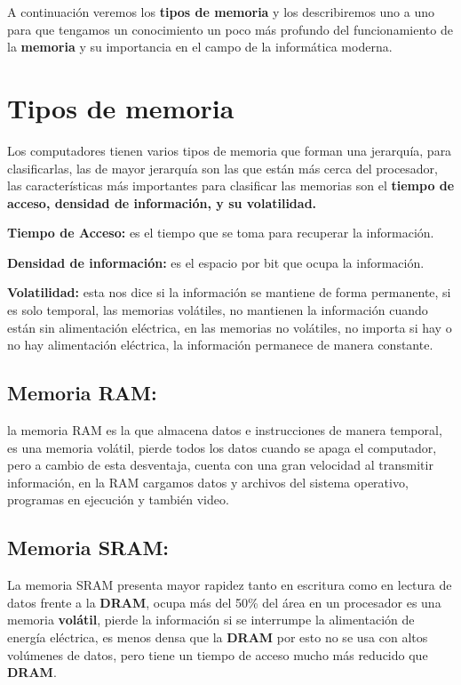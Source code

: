 \documentclass{article}
\begin{document}
\vspace{0.5cm}

A continuación veremos los \textbf{tipos de memoria} y los describiremos uno a uno para que tengamos un conocimiento un poco más profundo del funcionamiento de la \textbf{memoria} y su importancia en el campo de la informática moderna. 

\section{Tipos de memoria}

Los computadores tienen varios tipos de memoria que forman una jerarquía, para clasificarlas, las de mayor jerarquía son las que están más cerca del procesador, las características más importantes para clasificar las memorias son el \textbf{tiempo de acceso, densidad de información, y su volatilidad.}\cite{Pablo}

\vspace{0.5cm}

\textbf{Tiempo de Acceso:} es el tiempo que se toma para recuperar la información.

\vspace{0.5cm}

\textbf{Densidad de información:} es el espacio por bit que ocupa la información.

\vspace{0.5cm}

\textbf{Volatilidad:} esta nos dice si la información se mantiene de forma permanente, si es solo temporal, las memorias volátiles, no mantienen la información cuando están sin alimentación eléctrica, en las memorias no volátiles, no importa si hay o no hay alimentación eléctrica, la información permanece de manera constante.\cite{Pablo}

\subsection{Memoria RAM:} la memoria RAM es la que almacena datos e instrucciones de manera temporal, es una memoria volátil, pierde todos los datos cuando se apaga el computador, pero a cambio de esta desventaja, cuenta con una gran velocidad al transmitir información, en la RAM cargamos datos y archivos del sistema operativo, programas en ejecución y también video.\cite{Pablo}

\subsection{Memoria SRAM:}
La memoria SRAM presenta mayor rapidez tanto en escritura como en lectura de datos frente a la \textbf{DRAM},  ocupa más del 50\% del área en un procesador es una memoria \textbf{volátil}, pierde la información si se interrumpe la alimentación de energía eléctrica, es menos densa que la \textbf{DRAM} por esto no se usa con altos volúmenes de datos, pero tiene un tiempo de acceso mucho más reducido que \textbf{DRAM}\cite{semanticscholarwebsite}.
\end{document}
